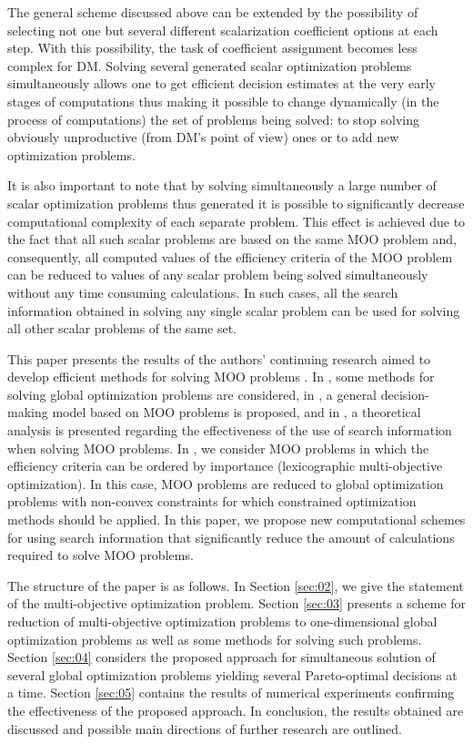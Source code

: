 \documentclass[runningheads]{llncs}
\begin{document}
The general scheme discussed above can be extended by the possibility of selecting not one but several different scalarization coefficient options at each step. With this possibility, the task of coefficient assignment becomes less complex for DM. Solving several generated scalar optimization problems simultaneously allows one to get efficient decision estimates at the very early stages of computations thus making it possible to change dynamically (in the process of computations) the set of problems being solved: to stop solving obviously unproductive (from DM's point of view) ones or to add new optimization problems.

It is also important to note that by solving simultaneously a large number of scalar optimization problems thus generated it is possible to significantly decrease computational complexity of each separate problem. This effect is achieved due to the fact that all such scalar problems  are based on the same MOO problem and, consequently, all computed values of the efficiency criteria of the MOO problem can be reduced to values of any scalar problem being solved simultaneously without any time consuming calculations. In such cases, all the search information obtained in solving any single scalar problem can be used for solving all other scalar problems of the same set. 

This paper presents the results of the authors' continuing research aimed to develop efficient methods for solving MOO problems \cite{c35,c36,c37,c44}. In \cite{c35}, some methods for solving global optimization problems are considered, in \cite{c36},  a general decision-making model based on MOO problems is proposed, and in \cite{c37}, a theoretical analysis is presented regarding the effectiveness of the use of search information when solving MOO problems. In \cite{c44}, we consider MOO problems in which the efficiency criteria can be ordered by importance (lexicographic multi-objective optimization). In this case, MOO problems are reduced to global optimization problems with non-convex constraints for which constrained optimization methods should be applied. In this paper, we propose new computational schemes for using search information that significantly reduce the amount of calculations required to solve MOO problems.

The structure of the paper is as follows. In Section \ref{sec:02}, we give the statement of the multi-objective optimization problem. Section \ref{sec:03} presents a scheme for reduction of multi-objective optimization problems to one-dimensional global optimization problems as well as some methods for solving such problems. Section \ref{sec:04} considers the proposed approach for simultaneous solution of several global optimization problems yielding several Pareto-optimal decisions at a time. Section \ref{sec:05} contains the results of numerical experiments confirming the effectiveness of the proposed approach. In conclusion, the results obtained are discussed and possible main directions of further research are outlined.
\end{document}
